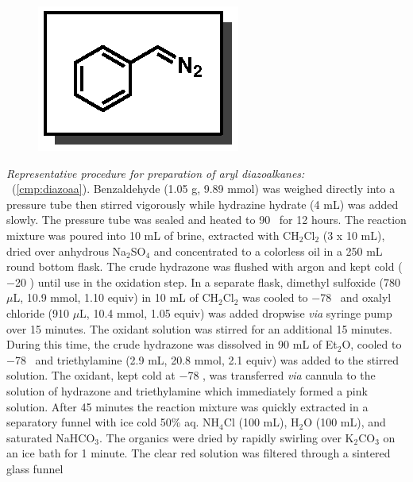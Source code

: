 \pagebreak
\begin{figure}
  \vspace{-10pt}
  \begin{center}
    \includegraphics[scale=0.8]{chp_asymmetric/images/diazoaa}
  \end{center}
  \vspace{-30pt}
\end{figure}\noindent \textit{Representative procedure for preparation of
aryl diazoalkanes:} \\ \textbf{\CMPdiazoaa}\ (\ref{cmp:diazoaa}).
Benzaldehyde (1.05 g, 9.89 mmol) was weighed directly into a pressure tube then
stirred vigorously while hydrazine hydrate (4 mL) was added slowly. The pressure
tube was sealed and heated to 90 \degc \ for 12 hours. The reaction mixture was
poured into 10 mL of brine, extracted with CH$_2$Cl$_2$ (3 x 10 mL), dried over
anhydrous Na$_2$SO$_4$ and concentrated to a colorless oil in a 250 mL round
bottom flask. The crude hydrazone was flushed with argon and kept cold ($-$20
\degc) until use in the oxidation step. In a separate flask, dimethyl sulfoxide
(780 $\mu$L, 10.9 mmol, 1.10 equiv) in 10 mL of CH$_2$Cl$_2$ was cooled to $-$78
\degc\  and oxalyl chloride (910 $\mu$L, 10.4 mmol, 1.05 equiv) was added
dropwise \textit{via} syringe pump over 15 minutes. The oxidant solution was
stirred for an additional 15 minutes. During this time, the crude hydrazone was
dissolved in 90 mL of Et$_2$O, cooled to $-$78 \degc\ and triethylamine (2.9 mL,
20.8 mmol, 2.1 equiv) was added to the stirred solution. The oxidant, kept cold
at $-$78 \degc, was transferred \textit{via} cannula to the solution of
hydrazone and triethylamine which immediately formed a pink solution. After 45
minutes the reaction mixture was quickly extracted in a separatory funnel with
ice cold 50\% aq. NH$_4$Cl (100 mL), H$_2$O (100 mL), and saturated NaHCO$_3$.
The organics were dried by rapidly swirling over K$_2$CO$_3$ on an ice bath for
1 minute. The clear red solution was filtered through a sintered glass funnel
